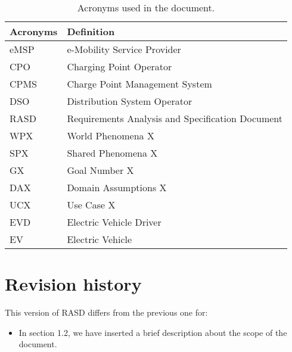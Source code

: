 \begin{table}[H]
    \begin{center}
        \begin{tabular}{ |l|l| }
            \hline
            \textbf{Acronyms} & \textbf{Definition}                              \\
            \hline
            eMSP              & e-Mobility Service Provider                      \\
            \hline
            CPO               & Charging Point Operator                          \\
            \hline
            CPMS              & Charge Point Management System                   \\
            \hline
            DSO               & Distribution System Operator                     \\
            \hline
            RASD              & Requirements Analysis and Specification Document \\
            \hline
            WPX               & World Phenomena X                                \\
            \hline
            SPX               & Shared Phenomena X                               \\
            \hline
            GX                & Goal Number X                                    \\
            \hline
            DAX               & Domain Assumptions X                             \\
            \hline
            UCX               & Use Case X                                       \\
            \hline
            EVD               & Electric Vehicle Driver                          \\
            \hline
            EV                & Electric Vehicle                                 \\
            \hline
        \end{tabular}
        \caption{Acronyms used in the document.}
        \label{tab:acronyms}%
    \end{center}
\end{table}


\section{Revision history}
\label{sec:revision_history}%
This version of RASD differs from the previous one for:
\begin{itemize}
    \item In section 1.2, we have inserted a brief description about the scope of the document.
\end{itemize}


